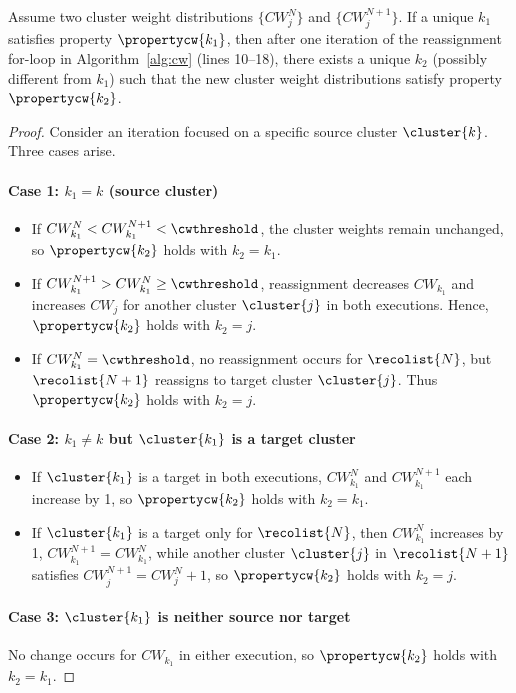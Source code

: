 \begin{lemma}\label{lemma:lemma-2}
Assume two cluster weight distributions $\{CW_j^{N}\}$ and $\{CW_j^{N+1}\}$. If a unique $k_1$ satisfies property $\propertycw{k_1}$, then after one iteration of the reassignment for-loop in Algorithm~\ref{alg:cw} (lines 10--18), there exists a unique $k_2$ (possibly different from $k_1$) such that the new cluster weight distributions satisfy property $\propertycw{k_2}$.
\end{lemma}

\begin{proof}
Consider an iteration focused on a specific source cluster $\cluster{k}$. Three cases arise.

\paragraph{Case 1: $k_1 = k$ (source cluster)} 
\begin{itemize}
\item[(i)] If $CW_{k_1}^{N} < CW_{k_1}^{N+1} < \cwthreshold$, the cluster weights remain unchanged, so $\propertycw{k_2}$ holds with $k_2 = k_1$.
\item[(ii)] If $CW_{k_1}^{N+1} > CW_{k_1}^{N} \ge \cwthreshold$, reassignment decreases $CW_{k_1}$ and increases $CW_j$ for another cluster $\cluster{j}$ in both executions. Hence, $\propertycw{k_2}$ holds with $k_2 = j$.
\item[(iii)] If $CW_{k_1}^{N} = \cwthreshold$, no reassignment occurs for $\recolist{N}$, but $\recolist{N+1}$ reassigns to target cluster $\cluster{j}$. Thus $\propertycw{k_2}$ holds with $k_2 = j$.
\end{itemize}

\paragraph{Case 2: $k_1 \neq k$ but $\cluster{k_1}$ is a target cluster} 
\begin{itemize}
\item[(i)] If $\cluster{k_1}$ is a target in both executions, $CW_{k_1}^{N}$ and $CW_{k_1}^{N+1}$ each increase by 1, so $\propertycw{k_2}$ holds with $k_2 = k_1$.
\item[(ii)] If $\cluster{k_1}$ is a target only for $\recolist{N}$, then $CW_{k_1}^{N}$ increases by 1, $CW_{k_1}^{N+1} = CW_{k_1}^{N}$, while another cluster $\cluster{j}$ in $\recolist{N+1}$ satisfies $CW_j^{N+1} = CW_j^N + 1$, so $\propertycw{k_2}$ holds with $k_2 = j$.
\end{itemize}

\paragraph{Case 3: $\cluster{k_1}$ is neither source nor target} 
No change occurs for $CW_{k_1}$ in either execution, so $\propertycw{k_2}$ holds with $k_2 = k_1$.
\end{proof}

